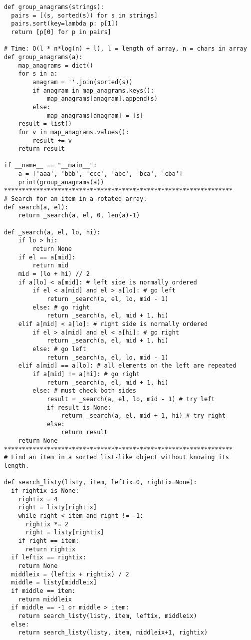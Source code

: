 \documentclass[12pt]{article}
\begin{document}
\begin{lstlisting}
def group_anagrams(strings):
  pairs = [(s, sorted(s)) for s in strings]
  pairs.sort(key=lambda p: p[1])
  return [p[0] for p in pairs]

# Time: O(l * n*log(n) + l), l = length of array, n = chars in array
def group_anagrams(a):
    map_anagrams = dict()
    for s in a:
        anagram = ''.join(sorted(s))
        if anagram in map_anagrams.keys():
            map_anagrams[anagram].append(s)
        else:
            map_anagrams[anagram] = [s]
    result = list()
    for v in map_anagrams.values():
        result += v
    return result

if __name__ == "__main__":
    a = ['aaa', 'bbb', 'ccc', 'abc', 'bca', 'cba']
    print(group_anagrams(a))
****************************************************************
# Search for an item in a rotated array.
def search(a, el):
    return _search(a, el, 0, len(a)-1)

def _search(a, el, lo, hi):
    if lo > hi:
        return None
    if el == a[mid]:
        return mid
    mid = (lo + hi) // 2
    if a[lo] < a[mid]: # left side is normally ordered
        if el < a[mid] and el > a[lo]: # go left
            return _search(a, el, lo, mid - 1)
        else: # go right
            return _search(a, el, mid + 1, hi)
    elif a[mid] < a[lo]: # right side is normally ordered
        if el > a[mid] and el < a[hi]: # go right
            return _search(a, el, mid + 1, hi)
        else: # go left
            return _search(a, el, lo, mid - 1)
    elif a[mid] == a[lo]: # all elements on the left are repeated
        if a[mid] != a[hi]: # go right
            return _search(a, el, mid + 1, hi)
        else: # must check both sides
            result = _search(a, el, lo, mid - 1) # try left
            if result is None:
                return _search(a, el, mid + 1, hi) # try right
            else:
                return result
    return None
****************************************************************
# Find an item in a sorted list-like object without knowing its length.

def search_listy(listy, item, leftix=0, rightix=None):
  if rightix is None:
    rightix = 4
    right = listy[rightix]
    while right < item and right != -1:
      rightix *= 2
      right = listy[rightix]
    if right == item:
      return rightix
  if leftix == rightix:
    return None
  middleix = (leftix + rightix) / 2
  middle = listy[middleix]
  if middle == item:
    return middleix
  if middle == -1 or middle > item:
    return search_listy(listy, item, leftix, middleix)
  else:
    return search_listy(listy, item, middleix+1, rightix)


\end{lstlisting}
\end{document}
